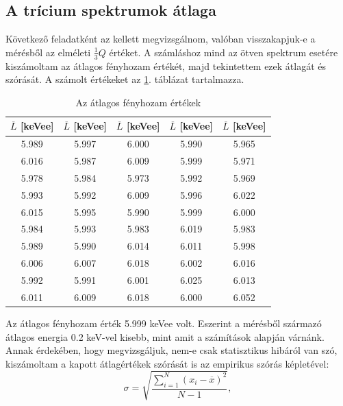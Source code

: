 \documentclass[12pt,a4paper]{article}
\begin{document}
\subsection{A trícium spektrumok átlaga}
\hspace*{10pt} Következő feladatként az kellett megvizsgálnom, valóban visszakapjuk-e a mérésből az elméleti $\frac{1}{3}Q$ értéket. A számláshoz mind az ötven spektrum esetére kiszámoltam az átlagos fényhozam értékét, majd tekintettem ezek átlagát és szórását. A számolt értékeket az \ref{tab:atlagok}. táblázat tartalmazza.\\
\begin{table}
\begin{center}
\begin{tabular}{|c||c||c||c||c|}
\hline
$\overline{L}$ [keVee]& $\overline{L}$ [keVee]& $\overline{L}$ [keVee]& $\overline{L}$ [keVee]& $\overline{L}$ [keVee]\\
\hline
5.989 & 5.997 & 6.000 & 5.990 & 5.965\\
\hline 
6.016 & 5.987 & 6.009 & 5.999 & 5.971\\
\hline 
5.978 & 5.984 & 5.973 & 5.992 & 5.969\\ 
\hline 
5.993 & 5.992 & 6.009 & 5.996 & 6.022\\ 
\hline 
6.015 & 5.995 & 5.990 & 5.999 & 6.000\\ 
\hline 
5.984 & 5.993 & 5.983 & 6.019 & 5.983\\ 
\hline 
5.989 & 5.990 & 6.014 & 6.011 & 5.998\\ 
\hline 
6.006 & 6.007 & 6.018 & 6.002 & 6.016\\ 
\hline 
5.992 & 5.991 & 6.001 & 6.025 & 6.013\\ 
\hline 
6.011 & 6.009 & 6.018 & 6.000 & 6.052\\ 
\hline 
\end{tabular}
\caption{Az átlagos fényhozam értékek}
\label{tab:atlagok}
\end{center}
\end{table}
\hspace*{10pt} Az átlagos fényhozam érték 5.999 keVee volt. Eszerint a mérésből származó átlagos energia 0.2 keV-vel kisebb, mint amit a számítások alapján várnánk. Annak érdekében, hogy megvizsgáljuk, nem-e csak statisztikus hibáról van szó, kiszámoltam a kapott átlagértékek szórását is az empirikus szórás képletével:
\begin{equation}
\sigma=\sqrt{\frac{\sum_{i=1}^{N}(x_i-\overline{x})^2}{N-1}},
\end{equation}
\end{document}

